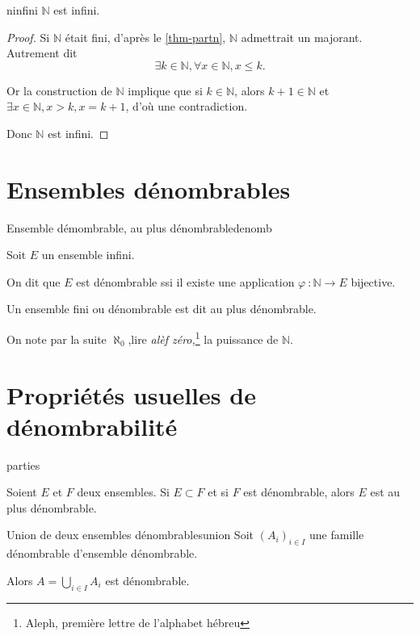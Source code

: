 \documentclass[a4paper,french]{memoir}
\begin{document}
\begin{theoremb}{}{ninfini}
	$\mathbb{N}$ est infini. 
\end{theoremb}


\begin{proof}
	Si $\mathbb{N}$ était fini, d'après le \cref{thm-partn}, $\mathbb{N}$ admettrait un majorant. Autrement dit \[\exists k \in \mathbb{N}, \forall x \in \mathbb{N}, x \leq k.\]

	Or la construction de $\mathbb{N}$ implique que si $ k \in \mathbb{N}$, alors $k + 1 \in \mathbb{N}$ et $\exists x \in \mathbb{N}, x > k, x= k+1$, d'où une contradiction. 
	
	Donc $\mathbb{N}$ est infini.
\end{proof}

\section{Ensembles dénombrables}

\begin{defb}{Ensemble démombrable, au plus dénombrable}{denomb}

	 Soit $E$ un ensemble infini. 
	 
	 On dit que $E$ est dénombrable ssi il existe une application $\varphi~: \mathbb{N} \to E $ bijective. 
	 
	 Un ensemble fini ou dénombrable est dit au plus dénombrable. 
\end{defb}

On note par la suite $\aleph_0$,lire \emph{alèf zéro,}\footnote{Aleph, première lettre  de l'alphabet hébreu} la puissance de $\mathbb{N}$. 

\section{Propriétés usuelles de dénombrabilité}

\begin{theoremb}{}{parties}

	Soient $E$ et $F$ deux ensembles. 
	Si $E \subset F$ et si $F$ est dénombrable, alors $E$ est au plus dénombrable.
\end{theoremb}

\begin{theoremb}{Union de deux ensembles dénombrables}{union}
    Soit $(A_i)_{i \in I}$ une famille dénombrable d'ensemble dénombrable. 
	
	Alors $A= \bigcup_{i \in I} A_i$ est dénombrable. 
\end{theoremb}
\end{document}
